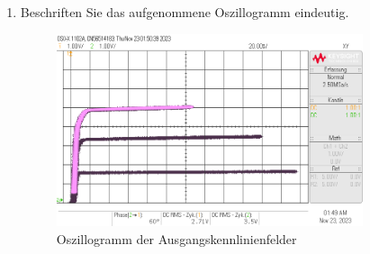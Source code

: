 \begin{enumerate}[label=\alph*)]
	      \pagebreak
	\item Beschriften Sie das aufgenommene Oszillogramm eindeutig.
	      \begin{figure}[h!]
		      \begin{center}
			      \includegraphics[width=0.85\textwidth]{img/V1/Ausgang.png}
		      \end{center}
		      \caption{Oszillogramm der Ausgangskennlinienfelder}
	      \end{figure}
\end{enumerate}
